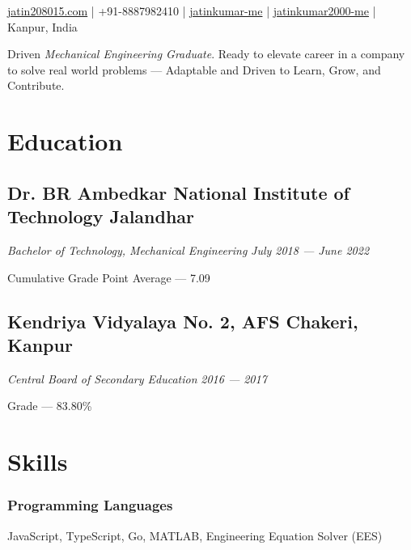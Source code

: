 \documentclass[a4paper]{article}
\author{Jatin Kumar}
\begin{document}
\begin{center}
	\makeatletter
	\centering {\huge \@author}
	\makeatother
	\vspace{6pt}

	\href{mailto:jatin208015\@gmail.com}{{\faAt} jatin208015\@gmail.com} |
	{\faPhone } +91-8887982410 |
	\href{https://github.com/jatinkumar-me}{{\faGithub} jatinkumar-me} |
	\href{https://www.linkedin.com/in/jatinkumar-2000-me/}{{\faLinkedin} {jatinkumar2000-me}} |
	{\faMapMarker} Kanpur, India
\end{center}

\vspace{-13pt}
\hrulefill
\vspace{-8pt}

\begin{center}
	Driven \textit{Mechanical Engineering Graduate}. Ready to elevate career in a company to solve real world problems — Adaptable and Driven to Learn, Grow, and Contribute.
\end{center}

\section{Education}
\subsection{Dr. BR Ambedkar National Institute of Technology Jalandhar}
\textit{Bachelor of Technology, Mechanical Engineering}
\hfill
\textit{July 2018 --- June 2022}

Cumulative Grade Point Average --- 7.09

\subsection{Kendriya Vidyalaya No. 2, AFS Chakeri, Kanpur}
\textit{Central Board of Secondary Education}
\hfill
\textit{2016 --- 2017}

Grade --- 83.80\%


\section{Skills}
\subsubsection*{Programming Languages}
JavaScript, TypeScript, Go, MATLAB, Engineering Equation Solver (EES)
\vspace{-10pt}
\end{document}
